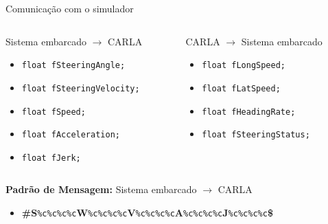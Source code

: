 \documentclass{if-beamer}
\begin{document}
\begin{frame}{Comunicação com o simulador}
	
	\begin{columns}
		
		\begin{column}{0.435\textwidth}
			
			\begin{block}{Sistema embarcado $\longrightarrow$ CARLA}
				
				\begin{itemize}
					\item \texttt{float fSteeringAngle;}
					\item \texttt{float fSteeringVelocity;}
					\item \texttt{float fSpeed;}
					\item \texttt{float fAcceleration;}
					\item \texttt{float fJerk;}					
				\end{itemize}
				
			\end{block}
			
		\end{column}
		
		\begin{column}{0.435\textwidth}
			
			\begin{block}{CARLA $\longrightarrow$ Sistema embarcado }
				
				\begin{itemize}
					\item \texttt{float fLongSpeed;}
					\item \texttt{float fLatSpeed;}
					\item \texttt{float fHeadingRate;}
					\item \texttt{float fSteeringStatus;}
					
				\end{itemize}
			
				
				
			\end{block}
			
		\end{column}
		
	\end{columns}

	\begin{block}{}
		
		\textbf{Padrão de Mensagem:} Sistema embarcado $\longrightarrow$ CARLA
		
		\begin{itemize}
			\item \textbf{\#S}\texttt{\%c\%c\%c\%c}\textbf{W}\texttt{\%c\%c\%c\%c}\textbf{V}\texttt{\%c\%c\%c\%c}\textbf{A}\texttt{\%c\%c\%c\%c}\textbf{J}\texttt{\%c\%c\%c\%c}\textbf{\$}
			

\end{itemize}
\end{block}
\end{frame}
\end{document}
